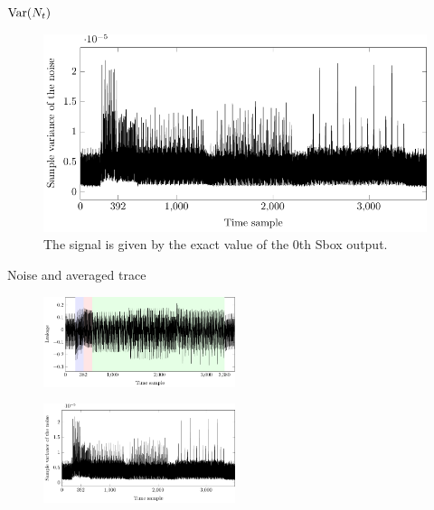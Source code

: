 \begin{frame}{$\textrm{Var}{\left(N_t\right)}$}
    \begin{figure}
        \centering
        \includegraphics{fig/noise_identity_model.pdf}
        \caption{
        The signal is given by the exact value of the $0$th Sbox output.}
    \end{figure}
\end{frame}

\begin{frame}{Noise and averaged trace}
 \begin{figure}
        \centering
        \includegraphics[width=0.5\textwidth]{fig/PRESENT_plot___one_round_average___highlighted_operations.pdf}
    \end{figure}
    \begin{figure}
        \centering
        \includegraphics[width=0.5\textwidth]{fig/noise_identity_model.pdf}
    \end{figure}
\end{frame}

